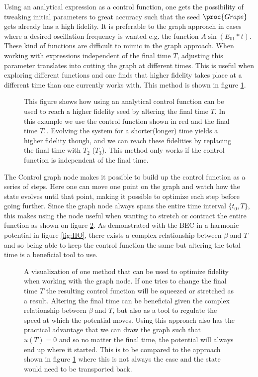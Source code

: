 \documentclass[aps,pra,reprint,superscriptaddress]{revtex4-1}
\begin{document}
Using an analytical expression as a control function, one gets the possibility of tweaking initial parameters to great accuracy such that the seed $\proc{Grape}$ gets already has a high fidelity. It is preferable to the graph approach in cases where a desired oscillation frequency is wanted e.g. the function $A\sin(E_{01}*t)$. These kind of functions are difficult to mimic in the graph approach. When working with expressions independent of the final time $T$, adjusting this parameter translates into cutting the graph at different times. This is useful when exploring different functions and one finds that higher fidelity takes place at a different time than one currently works with. This method is shown in figure \ref{fig:funcAppr}. \\
\begin{figure}
	\def\svgwidth{\columnwidth}
	
	\caption{This figure shows how using an analytical control function can be used to reach a higher fidelity seed by altering the final time $T$. In this example we use the control function shown in red and the final time $T_1$. Evolving the system for a shorter(longer) time yields a higher fidelity though, and we can reach these fidelities by replacing the final time with $T_2$ ($T_3$). This method only works if the control function is independent of the final time.}
	\label{fig:funcAppr}
\end{figure}

The Control graph node makes it possible to build up the control function as a series of steps. Here one can move one point on the graph and watch how the state evolves until that point, making it possible to optimize each step before going further. Since the graph node always spans the entire time interval $\{t_0,T\}$, this makes using the node useful when wanting to stretch or contract the entire function as shown on figure \ref{fig:graphAppr}. As demonstrated with the BEC in a harmonic potential in figure \ref{fig:HO}, there exists a complex relationship between $\beta$ and $T$ and so being able to keep the control function the same but altering the total time is a beneficial tool to use.\\

\begin{figure}
	\def\svgwidth{\columnwidth}
	
	\caption{A visualization of one method that can be used to optimize fidelity when working with the graph node. If one tries to change the final time $T$ the resulting control function will be squeezed or stretched as a result. Altering the final time can be beneficial given the complex relationship between $\beta$ and $T$, but also as a tool to regulate the speed at which the potential moves. Using this approach also has the practical advantage that we can draw the graph such that $u(T)=0$ and so no matter the final time, the potential will always end up where it started. This is to be compared to the approach shown in figure \ref{fig:funcAppr} where this is not always the case and the state would need to be transported back.}
	\label{fig:graphAppr}
\end{figure}
\end{document}
